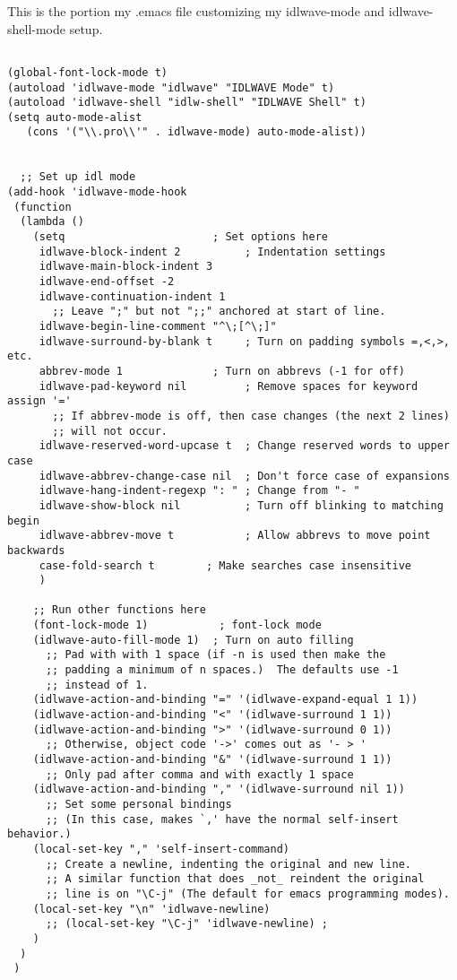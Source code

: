   This is the portion my .emacs file customizing my idlwave-mode and
  idlwave-shell-mode setup.


\begin{verbatim}

(global-font-lock-mode t)
(autoload 'idlwave-mode "idlwave" "IDLWAVE Mode" t)
(autoload 'idlwave-shell "idlw-shell" "IDLWAVE Shell" t)
(setq auto-mode-alist  
   (cons '("\\.pro\\'" . idlwave-mode) auto-mode-alist))


  ;; Set up idl mode
(add-hook 'idlwave-mode-hook
 (function 
  (lambda ()
    (setq                       ; Set options here
     idlwave-block-indent 2          ; Indentation settings
     idlwave-main-block-indent 3
     idlwave-end-offset -2
     idlwave-continuation-indent 1
       ;; Leave ";" but not ";;" anchored at start of line.
     idlwave-begin-line-comment "^\;[^\;]" 
     idlwave-surround-by-blank t     ; Turn on padding symbols =,<,>, etc.
     abbrev-mode 1              ; Turn on abbrevs (-1 for off)
     idlwave-pad-keyword nil         ; Remove spaces for keyword assign '='
       ;; If abbrev-mode is off, then case changes (the next 2 lines)
       ;; will not occur.
     idlwave-reserved-word-upcase t  ; Change reserved words to upper case
     idlwave-abbrev-change-case nil  ; Don't force case of expansions
     idlwave-hang-indent-regexp ": " ; Change from "- "
     idlwave-show-block nil          ; Turn off blinking to matching begin
     idlwave-abbrev-move t           ; Allow abbrevs to move point backwards
     case-fold-search t        ; Make searches case insensitive
     )
    
    ;; Run other functions here
    (font-lock-mode 1)           ; font-lock mode
    (idlwave-auto-fill-mode 1)  ; Turn on auto filling
      ;; Pad with with 1 space (if -n is used then make the 
      ;; padding a minimum of n spaces.)  The defaults use -1
      ;; instead of 1.
    (idlwave-action-and-binding "=" '(idlwave-expand-equal 1 1))
    (idlwave-action-and-binding "<" '(idlwave-surround 1 1))
    (idlwave-action-and-binding ">" '(idlwave-surround 0 1)) 
      ;; Otherwise, object code '->' comes out as '- > '
    (idlwave-action-and-binding "&" '(idlwave-surround 1 1))
      ;; Only pad after comma and with exactly 1 space
    (idlwave-action-and-binding "," '(idlwave-surround nil 1))
      ;; Set some personal bindings
      ;; (In this case, makes `,' have the normal self-insert behavior.)
    (local-set-key "," 'self-insert-command)
      ;; Create a newline, indenting the original and new line.
      ;; A similar function that does _not_ reindent the original
      ;; line is on "\C-j" (The default for emacs programming modes).
    (local-set-key "\n" 'idlwave-newline)
      ;; (local-set-key "\C-j" 'idlwave-newline) ; 
    )
  )
 )


\end{verbatim}
